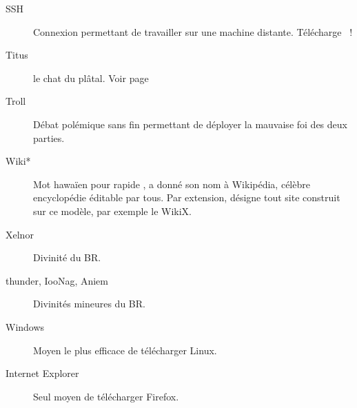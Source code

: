 \begin{description}
  \item[SSH] Connexion permettant de travailler sur une machine distante. Télécharge ~!

  \item[Titus] le chat du plâtal. Voir page \pageref{titus}

  \item[Troll] Débat polémique sans fin permettant de déployer la mauvaise foi des deux parties.



  \item[Wiki*] Mot hawa\"ien pour \og rapide \fg, a donné son nom à Wikipédia, célèbre encyclopédie éditable par tous.
  Par extension, désigne tout site construit sur ce modèle, par exemple le WikiX.%

  \item[Xelnor] Divinité du BR.

  \item[thunder, IooNag, Aniem] Divinités mineures du BR.

  \item[Windows] Moyen le plus efficace de télécharger Linux.

  \item[Internet Explorer] Seul moyen de télécharger Firefox.

\end{description}
